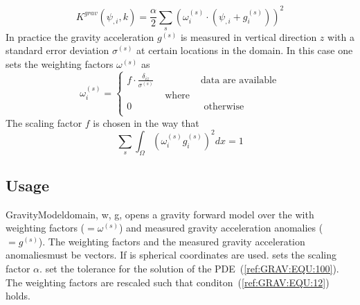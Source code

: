 \begin{equation}\label{ref:GRAV:EQU:10}
K^{grav}(\psi_{,i},k) = \frac{\alpha}{2}\sum_{s} ( \omega^{(s)}_i \cdot (\psi_{,i}+ g^{(s)}_i) ) ^2
\end{equation} 
In practice the gravity acceleration $g^{(s)}$ is measured in vertical direction $z$ with a 
standard error deviation $\sigma^{(s)}$ at certain locations in the domain. In this case
one sets the weighting factors $\omega^{(s)}$ as
\begin{equation}\label{ref:GRAV:EQU:11}
\omega^{(s)}_i 
= \left\{
\begin{array}{lcl}
f \cdot  \frac{\delta_{iz}}{\sigma^{(s)}} & & \mbox{data are available} \\
& \mbox{ where } & \\
0 & & \mbox{ otherwise } \\
\end{array}
\right.
\end{equation} 
The scaling factor $f$ is chosen in the way that 
\begin{equation}\label{ref:GRAV:EQU:12}
\sum_{s} \int_{\Omega} ( \omega^{(s)}_i g^{(s)}_i ) ^2 dx =1 
\end{equation} 

\subsection{Usage}


\begin{classdesc}{GravityModel}{domain, 
w, g,
}
opens a gravity forward model over the \Domain {} with 
weighting factors  ($=\omega^{(s)}$) and measured gravity acceleration anomalies ($=g^{(s)}$).
The weighting factors and the  measured gravity acceleration anomalies\var must be vectors.
If  is \True spherical coordinates are used. 
 sets the scaling factor $\alpha$. 
 set the tolerance for the solution of the PDE~(\ref{ref:GRAV:EQU:100}).
The weighting factors are rescaled such that conditon~(\ref{ref:GRAV:EQU:12}) holds.
\end{classdesc}

